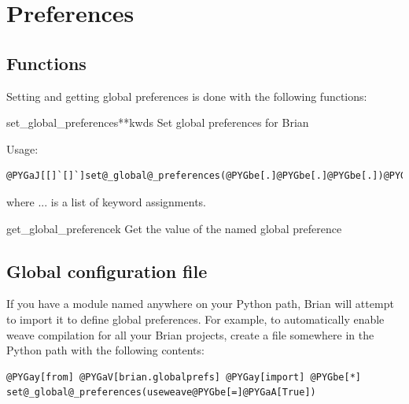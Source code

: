 \documentclass[letterpaper,10pt,english]{manual}
\begin{document}
\resetcurrentobjects
{}

\hypertarget{preferences}{}\section{Preferences}


\subsection{Functions}

Setting and getting global preferences is done with the following
functions:

\hypertarget{brian.set_global_preferences}{}\begin{funcdesc}{set\_global\_preferences}{**kwds}
Set global preferences for Brian

Usage:

\begin{Verbatim}[commandchars=@\[\]]
@PYGaJ[[]`[]`]set@_global@_preferences(@PYGbe[.]@PYGbe[.]@PYGbe[.])@PYGaJ[[]`[]`]
\end{Verbatim}

where ... is a list of keyword assignments.
\end{funcdesc}

\hypertarget{brian.get_global_preference}{}\begin{funcdesc}{get\_global\_preference}{k}
Get the value of the named global preference
\end{funcdesc}


\subsection{Global configuration file}

If you have a module named  anywhere on your Python path,
Brian will attempt to import it to define global preferences. For example, to
automatically enable weave compilation for all your Brian projects, create a
file  somewhere in the Python path with the following
contents:

\begin{Verbatim}[commandchars=@\[\]]
@PYGay[from] @PYGaV[brian.globalprefs] @PYGay[import] @PYGbe[*]
set@_global@_preferences(useweave@PYGbe[=]@PYGaA[True])
\end{Verbatim}
\end{document}
